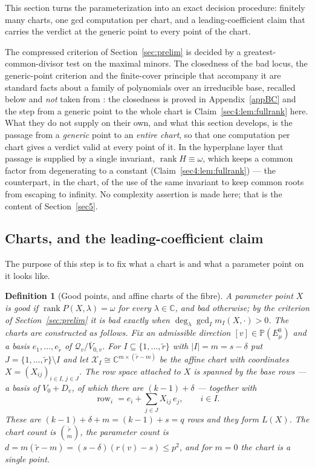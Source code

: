 \documentclass[journal]{IEEEtran}
\theoremstyle{plainn}
\newtheorem{defn}{Definition}
\theoremstyle{remark}
\newcommand{\row}{\operatorname{row}}
\newcommand{\rank}{\operatorname{rank}}
\begin{document}
This section turns the parameterization into an exact decision procedure: finitely many charts, one
gcd computation per chart, and a leading-coefficient claim that carries the verdict at the generic
point to every point of the chart.

The compressed criterion of Section~\ref{sec:prelim} is decided by a greatest-common-divisor test on
the maximal minors. The closedness of the bad locus, the generic-point criterion and the finite-cover
principle that accompany it are standard facts about a family of polynomials over an irreducible base,
recalled below and \emph{not} taken from \cite{companion1}: the closedness is proved in
Appendix~\ref{appBC} and the step from a generic point to the whole chart is Claim~\ref{sec4:lem:fullrank}
here. What they do not supply on their own, and what this section develops, is the passage from a
\emph{generic} point to an \emph{entire chart}, so that one computation per chart gives a verdict valid at
every point of it. In the hyperplane layer that passage is supplied by a single invariant,
$\rank H\equiv\omega$, which keeps a common factor from degenerating to a constant
(Claim~\ref{sec4:lem:fullrank}) --- the counterpart, in the chart, of the use of the same invariant to keep
common roots from escaping to infinity. No complexity assertion is made
here; that is the content of Section~\ref{sec5}.


\subsection{Charts, and the leading-coefficient claim}\label{sec4:charts}


The purpose of this step is to fix what a chart is and what a parameter point on it looks like.

\begin{defn}[Good points, and affine charts of the fibre]
\label{sec4:defn:goodbad}
\label{sec4:defn:charts}
A parameter point $X$ is \emph{good} if $\rank P(X,\lambda)=\omega$ for every $\lambda\in\mathbb C$,
and \emph{bad} otherwise; by the criterion of Section~\ref{sec:prelim} it is bad exactly when
$\deg_\lambda\gcd_I m_I(X,\cdot)>0$. The charts are constructed as follows. Fix an admissible direction
$[v]\in\mathbb P(E_\mu^0)$ and a basis $e_1,\dots,e_{\widetilde r}$ of
$\mathcal Q_v/\overline V_{0,v}$. For $I\subseteq\{1,\dots,\widetilde r\}$ with $|I|=m=s-\delta$ put
$J=\{1,\dots,\widetilde r\}\setminus I$ and let
$\mathcal X_I\cong\mathbb C^{m\times(\widetilde r-m)}$ be the affine chart with coordinates
$X=(X_{ij})_{i\in I,\,j\in J}$. The row space attached to $X$ is spanned by the base rows --- a basis
of $V_0+D_v$, of which there are $(k-1)+\delta$ --- together with
\[
\row_i=e_i+\sum_{j\in J}X_{ij}\,e_j,\qquad i\in I .
\]
These are $(k-1)+\delta+m=(k-1)+s=q$ rows and they form $L(X)$. The chart count is
$\binom{\widetilde r}{m}$, the parameter count is
$d=m(\widetilde r-m)=(s-\delta)(r(v)-s)\le p^2$, and for $m=0$ the chart is a single point.
\end{defn}
\end{document}
